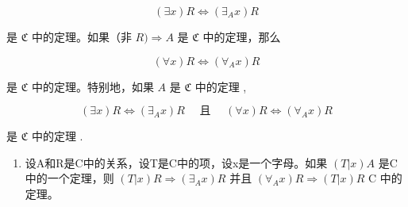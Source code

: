 \[
(\exists x) R \Longleftrightarrow (\exists_ {A} x) R
\]

是 \(\mathfrak{C}\) 中的定理。如果（非 \(R) \Longrightarrow A\) 是 \(\mathfrak{C}\) 中的定理，那么

\[
(\forall x) R \Longleftrightarrow (\forall_ {A} x) R
\]

是 \(\mathfrak{C}\) 中的定理。特别地，如果 \(A\) 是 \(\mathfrak{C}\) 中的定理 ,

\[
(\exists x) R \Longleftrightarrow (\exists_ {A} x) R \quad \text { 且 } \quad (\forall x) R \Longleftrightarrow (\forall_ {A} x) R
\]

是 \(\mathfrak{C}\) 中的定理 .

\begin{enumerate}
\def\labelenumi{\arabic{enumi}.}
\setcounter{enumi}{7}
\tightlist
\item
  设A和R是C中的关系，设T是C中的项，设x是一个字母。如果 \((T|x)A\) 是C中的一个定理，则 \((T|x)R \Longrightarrow (\exists_{A}x)R\) 并且 \((\forall_{A}x)R \Longrightarrow (T|x)R\) C 中的定理。
\end{enumerate}


